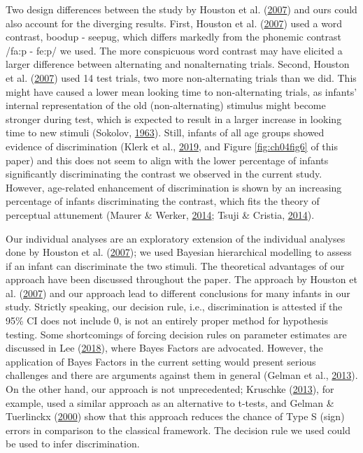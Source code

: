 \documentclass[openright,titlepage,12pt,a4paper]{book}
\begin{document}
Two design differences between the study by Houston et al. (\protect\hyperlink{ref-houston_assessing_2007}{2007}) and ours could also account for the diverging results. First, Houston et al. (\protect\hyperlink{ref-houston_assessing_2007}{2007}) used a word contrast, boodup - seepug, which differs markedly from the phonemic contrast /fa:p - fe:p/ we used. The more conspicuous word contrast may have elicited a larger difference between alternating and nonalternating trials. Second, Houston et al. (\protect\hyperlink{ref-houston_assessing_2007}{2007}) used 14 test trials, two more non-alternating trials than we did. This might have caused a lower mean looking time to non-alternating trials, as infants' internal representation of the old (non-alternating) stimulus might become stronger during test, which is expected to result in a larger increase in looking time to new stimuli (Sokolov, \protect\hyperlink{ref-sokolov_perception_1963}{1963}). Still, infants of all age groups showed evidence of discrimination (Klerk et al., \protect\hyperlink{ref-de_klerk_lost_2019}{2019}, and Figure \ref{fig:ch04fig6} of this paper) and this does not seem to align with the lower percentage of infants significantly discriminating the contrast we observed in the current study. However, age-related enhancement of discrimination is shown by an increasing percentage of infants discriminating the contrast, which fits the theory of perceptual attunement (Maurer \& Werker, \protect\hyperlink{ref-maurer_perceptual_2014}{2014}; Tsuji \& Cristia, \protect\hyperlink{ref-tsuji_perceptual_2014}{2014}).

Our individual analyses are an exploratory extension of the individual analyses done by Houston et al. (\protect\hyperlink{ref-houston_assessing_2007}{2007}); we used Bayesian hierarchical modelling to assess if an infant can discriminate the two stimuli. The theoretical advantages of our approach have been discussed throughout the paper. The approach by Houston et al. (\protect\hyperlink{ref-houston_assessing_2007}{2007}) and our approach lead to different conclusions for many infants in our study. Strictly speaking, our decision rule, i.e., discrimination is attested if the 95\% CI does not include 0, is not an entirely proper method for hypothesis testing. Some shortcomings of forcing decision rules on parameter estimates are discussed in Lee (\protect\hyperlink{ref-lee_bayesian_2018}{2018}), where Bayes Factors are advocated. However, the application of Bayes Factors in the current setting would present serious challenges and there are arguments against them in general (Gelman et al., \protect\hyperlink{ref-gelman_bayesian_2013}{2013}). On the other hand, our approach is not unprecedented; Kruschke (\protect\hyperlink{ref-kruschke_bayesian_2013}{2013}), for example, used a similar approach as an alternative to t-tests, and Gelman \& Tuerlinckx (\protect\hyperlink{ref-gelman_type_2000}{2000}) show that this approach reduces the chance of Type S (sign) errors in comparison to the classical framework. The decision rule we used could be used to infer discrimination.
\end{document}

